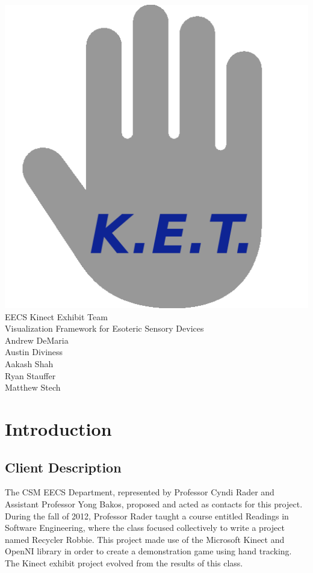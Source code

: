 \documentclass[11pt,letterpaper]{article}
\begin{document}
	\begin{center}
	\vspace*{\fill}
	\includegraphics[height=0.4\textheight]{logo} \\
	\linespread{2}
	\LARGE EECS Kinect Exhibit Team\\
	\Large Visualization Framework for Esoteric Sensory Devices \\
	\large Andrew DeMaria \\
	\linespread{1}
	\large Austin Diviness \\
	\large Aakash Shah \\
	\large Ryan Stauffer \\
	\large Matthew Stech \\
	\vspace*{\fill}
	\end{center}
	\thispagestyle{empty}
	\pagebreak
 
	\tableofcontents
	\thispagestyle{empty}
	\newpage
 
	\pagestyle{plain}
	\setcounter{page}{1}
	\section{Introduction}
	\subsection{Client Description}
	The CSM EECS Department, represented by Professor Cyndi Rader and 
	Assistant Professor Yong Bakos, proposed and acted as contacts for this 
	project. During the fall of 2012, Professor Rader taught a course entitled 
	Readings in Software Engineering, where the class focused collectively to 
	write a project named Recycler Robbie. This project made use of the 
	Microsoft Kinect and OpenNI library in order to create a demonstration 
	game using hand tracking. The Kinect exhibit project evolved from the 
	results of this class.
 
\end{document}
